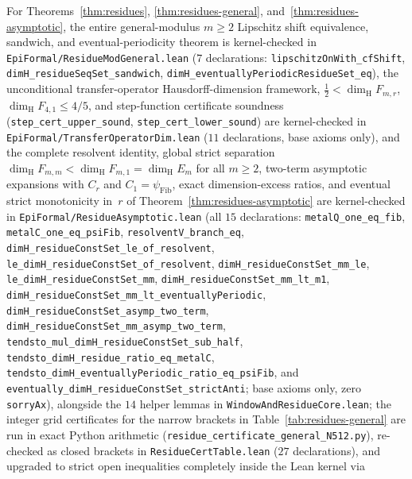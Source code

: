 \documentclass[11pt]{article}
\theoremstyle{definition}
\theoremstyle{remark}
\newcommand{\dimH}{\dim_{\mathrm{H}}}
\begin{document}
For Theorems~\ref{thm:residues}, \ref{thm:residues-general}, and~\ref{thm:residues-asymptotic}, the entire general-modulus $m\ge2$ Lipschitz shift equivalence, sandwich, and eventual-periodicity theorem is kernel-checked in \texttt{EpiFormal/\allowbreak Residue\allowbreak ModGeneral.lean} ($7$ declarations: \texttt{lipschitz\allowbreak OnWith\_\allowbreak cfShift}, \texttt{dimH\_\allowbreak residueSeqSet\_\allowbreak sandwich}, \texttt{dimH\_\allowbreak eventually\allowbreak PeriodicResidueSet\_\allowbreak eq}), the unconditional transfer-operator Hausdorff-dimension framework, $\frac12<\dimH F_{m,r}$, $\dimH F_{4,1}\le 4/5$, and step-function certificate soundness (\texttt{step\_\allowbreak cert\_\allowbreak upper\_\allowbreak sound}, \texttt{step\_\allowbreak cert\_\allowbreak lower\_\allowbreak sound}) are kernel-checked in \texttt{EpiFormal/\allowbreak Transfer\allowbreak Operator\allowbreak Dim.lean} ($11$ declarations, base axioms only), and the complete resolvent identity, global strict separation $\dimH F_{m,m}<\dimH F_{m,1}=\dimH E_m$ for all $m\ge2$, two-term asymptotic expansions with $C_r$ and $C_1=\psi_{\mathrm{Fib}}$, exact dimension-excess ratios, and eventual strict monotonicity in~$r$ of Theorem~\ref{thm:residues-asymptotic} are kernel-checked in \texttt{EpiFormal/\allowbreak Residue\allowbreak Asymptotic.lean} (all $15$ declarations: \texttt{metalQ\_\allowbreak one\_\allowbreak eq\_\allowbreak fib}, \texttt{metalC\_\allowbreak one\_\allowbreak eq\_\allowbreak psiFib}, \texttt{resolventV\_\allowbreak branch\_\allowbreak eq}, \texttt{dimH\_\allowbreak residueConstSet\_\allowbreak le\_\allowbreak of\_\allowbreak resolvent}, \texttt{le\_\allowbreak dimH\_\allowbreak residueConstSet\_\allowbreak of\_\allowbreak resolvent}, \texttt{dimH\_\allowbreak residueConstSet\_\allowbreak mm\_\allowbreak le}, \texttt{le\_\allowbreak dimH\_\allowbreak residueConstSet\_\allowbreak mm}, \texttt{dimH\_\allowbreak residueConstSet\_\allowbreak mm\_\allowbreak lt\_\allowbreak m1}, \texttt{dimH\_\allowbreak residueConstSet\_\allowbreak mm\_\allowbreak lt\_\allowbreak eventuallyPeriodic}, \texttt{dimH\_\allowbreak residueConstSet\_\allowbreak asymp\_\allowbreak two\_\allowbreak term}, \texttt{dimH\_\allowbreak residueConstSet\_\allowbreak mm\_\allowbreak asymp\_\allowbreak two\_\allowbreak term}, \texttt{tendsto\_\allowbreak mul\_\allowbreak dimH\_\allowbreak residueConstSet\_\allowbreak sub\_\allowbreak half}, \texttt{tendsto\_\allowbreak dimH\_\allowbreak residue\_\allowbreak ratio\_\allowbreak eq\_\allowbreak metalC}, \texttt{tendsto\_\allowbreak dimH\_\allowbreak eventuallyPeriodic\_\allowbreak ratio\_\allowbreak eq\_\allowbreak psiFib}, and \texttt{eventually\_\allowbreak dimH\_\allowbreak residueConstSet\_\allowbreak strictAnti}; base axioms only, zero \texttt{sorryAx}), alongside the $14$ helper lemmas in \texttt{Window\allowbreak And\allowbreak Residue\allowbreak Core.lean}; the integer grid certificates for the narrow brackets in Table~\ref{tab:residues-general} are run in exact Python arithmetic (\texttt{residue\_\allowbreak certificate\_\allowbreak general\_\allowbreak N512.py}), re-checked as closed brackets in \texttt{Residue\allowbreak Cert\allowbreak Table.lean} ($27$ declarations), and upgraded to strict open inequalities completely inside the Lean kernel via 
\end{document}
